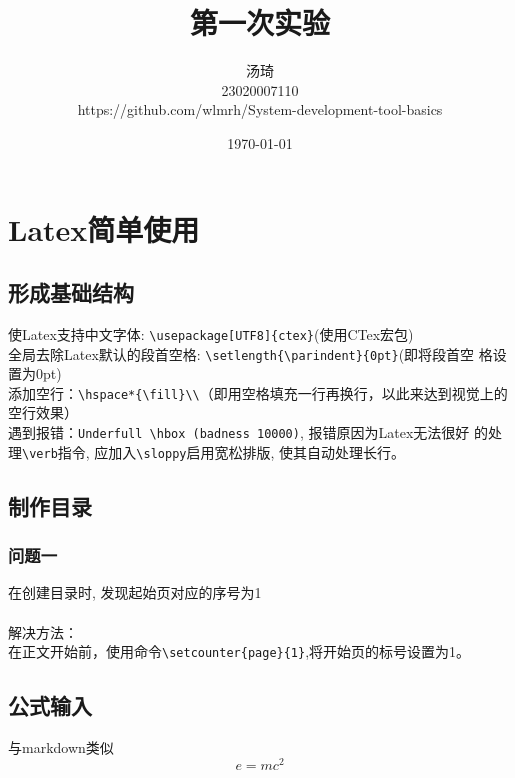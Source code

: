 \documentclass{article}
\begin{document}
    \title{第一次实验}
    \author{汤琦 \\ 23020007110\\ https://github.com/wlmrh/System-development-tool-basics}
    \date{\today}
    \maketitle

    \tableofcontents
    \newpage

    \setlength{\parindent}{0pt}
    \setcounter{page}{1}
    \sloppy

    \section{Latex简单使用}
        \subsection{形成基础结构}
        使Latex支持中文字体: \verb|\usepackage[UTF8]{ctex}|(使用CTex宏包)\\
        全局去除Latex默认的段首空格: \verb|\setlength{\parindent}{0pt}|(即将段首空
        格设置为0pt)\\
        添加空行：\verb|\hspace*{\fill}\\|（即用空格填充一行再换行，以此来达到视觉上的
        空行效果）\\
        遇到报错：\verb|Underfull \hbox (badness 10000)|, 报错原因为Latex无法很好
        的处理\verb|\verb|指令, 应加入\verb|\sloppy|启用宽松排版, 使其自动处理长行。

        \subsection{制作目录}
            \subsubsection{问题一}
            在创建目录时, 发现起始页对应的序号为1\\
            \hspace*{\fill} \\
            解决方法：\\
            在正文开始前，使用命令\verb|\setcounter{page}{1}|,将开始页的标号设置为1。

        \subsection{公式输入}
            与markdown类似
            \begin{equation}
            e=mc^2
            \end{equation}
\end{document}
